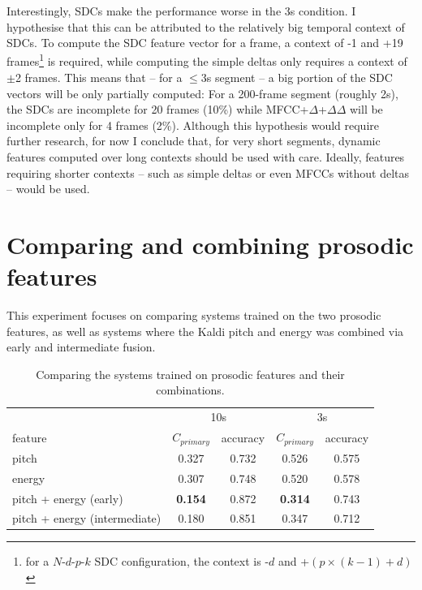 \documentclass[bsc,frontabs,twoside,singlespacing,parskip,deptreport]{infthesis}
\begin{document}
{{    Interestingly, SDCs make the performance worse in the 3s condition. I hypothesise that this can be attributed to the relatively big temporal context of SDCs. To compute the SDC feature vector for a frame, a context of -1 and +19 frames\footnote{for a $N$-$d$-$p$-$k$ SDC configuration, the context is -$d$ and +$(p\times(k-1)+d)$} is required, while computing the simple deltas only requires a context of $\pm$2 frames. This means that -- for a $\leq$3s segment -- a big portion of the SDC vectors will be only partially computed: For a 200-frame segment (roughly 2s), the SDCs are incomplete for 20 frames (10\%) while MFCC+$\Delta$+$\Delta\Delta$ will be incomplete only for 4 frames (2\%). Although this hypothesis would require further research, for now I conclude that, for very short segments, dynamic features computed over long contexts should be used with care. Ideally, features requiring shorter contexts -- such as simple deltas or even MFCCs without deltas -- would be used.    
  }

  \section{Comparing and combining prosodic features}{
    \label{sec:exp-prosodic}

    This experiment focuses on comparing systems trained on the two prosodic features, as well as systems where the Kaldi pitch and energy was combined via early and intermediate fusion.
    \begin{table}[h!tb]
      \centering
      \begin{sc}
        \footnotesize
        \begin{tabular}{l|cc|cc}
                  & \multicolumn{2}{c|}{10s}  & \multicolumn{2}{c}{3s} \\
          feature & $C_{primary}$ & accuracy & $C_{primary}$ & accuracy \\
          \hline
          pitch & 0.327 & 0.732 & 0.526 & 0.575\\
          energy & 0.307 & 0.748 & 0.520 & 0.578\\
          pitch + energy (early) & \textbf{0.154} & 0.872 & \textbf{0.314} & 0.743\\
          pitch + energy (intermediate) & 0.180 & 0.851 & 0.347 & 0.712\\
        \end{tabular}
      \end{sc}
      \caption{Comparing the systems trained on prosodic features and their combinations.}
      \label{tab:results-prosodic}
    \end{table}

}}
\end{document}
